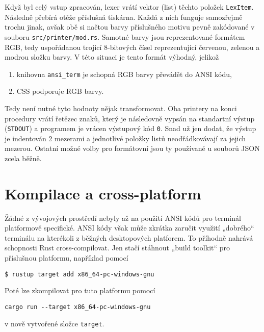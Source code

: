 \documentclass[11pt, letterpaper]{article}
\begin{document}
Když byl celý vstup zpracován, lexer vrátí vektor (list) těchto položek \texttt{LexItem}. Následně přebírá otěže příslušná tiskárna. Každá z nich funguje samozřejmě trochu jinak, avšak obě si načtou barvy příslušného motivu pevně zakódované v souboru \texttt{src/printer/mod.rs}. Samotné barvy jsou reprezentované formátem RGB, tedy uspořádanou trojicí 8-bitových čísel reprezentující červenou, zelenou a modrou složku barvy. V této situaci je tento formát výhodný, jelikož
\begin{enumerate}
    \item knihovna \texttt{ansi\_term} je schopná RGB barvy převádět do ANSI kódu,
    \item CSS podporuje RGB barvy.
\end{enumerate}

Tedy není nutné tyto hodnoty nějak transformovat. Oba printery na konci procedury vrátí řetězec znaků, který je následovně vypsán na standartní výstup (\texttt{STDOUT}) a programem je vrácen výstupový kód \texttt{0}. Snad už jen dodat, že výstup je indentován 2 mezerami a jednotlivé položky listů neodřádkovávají za jejich mezerou. Ostatní možné volby pro formátovní jsou ty používané u souborů JSON zcela běžně.

\section{Kompilace a cross-platform}
Žádné z vývojových prostředí nebyly až na použití ANSI kódů pro terminál platformově specifické. ANSI kódy však může zkrátka zaručit využití „dobrého“ terminálu na kterékoli z běžných desktopových platforem. To příhodně nahrává schopnosti Rust cross-compilovat. Jen stačí stáhnout „build toolkit“ pro příslušnou platformu, například pomocí
\begin{lstlisting}
$ rustup target add x86_64-pc-windows-gnu
\end{lstlisting}

Poté lze zkompilovat pro tuto platformu pomocí
\begin{lstlisting}
cargo run --target x86_64-pc-windows-gnu
\end{lstlisting}

v nově vytvořené složce \texttt{target}.
\end{document}
